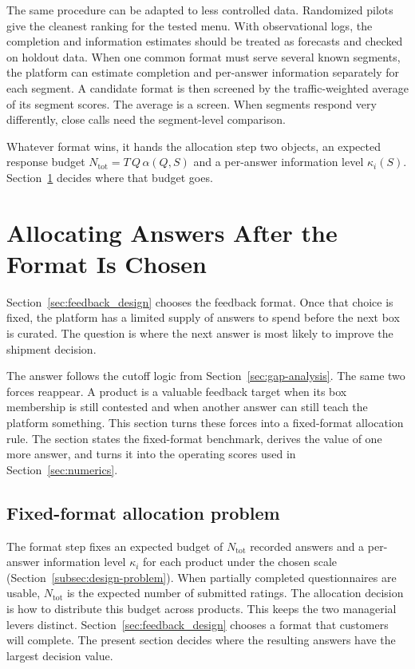 \documentclass[11pt]{article}
\theoremstyle{definition}
\theoremstyle{remark}
\newcommand{\1}{\mathbf{1}}
\begin{document}
The same procedure can be adapted to less controlled data. Randomized
pilots give the cleanest ranking for the tested menu. With observational
logs, the completion and information estimates should be treated as
forecasts and checked on holdout data. When one common format must
serve several known segments, the platform can estimate completion and
per-answer information separately for each segment. A candidate format is then screened by the traffic-weighted average of
its segment scores. The average is a screen. When segments respond very
differently, close calls need the segment-level comparison.

Whatever format wins, it hands the allocation step two objects, an expected response budget \(N_{\mathrm{tot}}=T\,Q\,\alpha(Q,S)\) and a
per-answer information level \(\kappa_i(S)\).
Section~\ref{sec:alloc_opt} decides where that budget goes.

\section{Allocating Answers After the Format Is Chosen}
\label{sec:alloc_opt}
Section~\ref{sec:feedback_design} chooses the feedback format. Once that
choice is fixed, the platform has a limited supply of answers to spend
before the next box is curated. The question is where the next answer is
most likely to improve the shipment decision.

The answer follows the cutoff logic from
Section~\ref{sec:gap-analysis}. The same two forces reappear. A product is a valuable feedback target when its box membership is still
contested and when another answer can still teach the platform
something. This section turns these forces into a fixed-format
allocation rule. The section states the fixed-format benchmark, derives the value of one more answer, and turns it into the operating scores used in Section~\ref{sec:numerics}.

\subsection{Fixed-format allocation problem}
\label{subsec:alloc-preamble}
\label{subsec:alloc-objective}

The format step fixes an expected budget of \(N_{\mathrm{tot}}\)
recorded answers and a per-answer information level \(\kappa_i\) for
each product under the chosen scale (Section~\ref{subsec:design-problem}). When partially completed questionnaires are usable,
\(N_{\mathrm{tot}}\) is the expected number of submitted ratings. The allocation decision is
how to distribute this budget across products. This keeps the two
managerial levers distinct. Section~\ref{sec:feedback_design} chooses a
format that customers will complete. The present section decides where
the resulting answers have the largest decision value.
\end{document}
